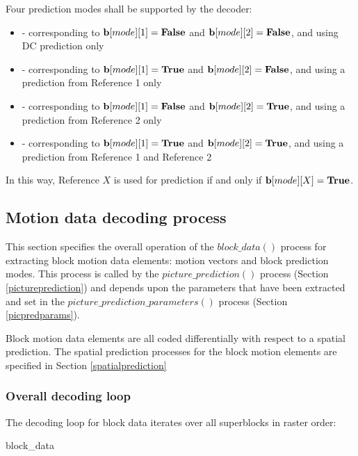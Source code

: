 Four prediction modes shall be supported by the decoder: 

\begin{itemize}
\item \Intra - corresponding to ${\bf b}[mode][1]=\text{\bf{False}}$ and ${\bf b}[mode][2]=\text{\bf{False}}$, and using DC prediction only
\item \RefOneOnly - corresponding to ${\bf b}[mode][1]=\text{\bf{True}}$ and ${\bf b}[mode][2]=\text{\bf{False}}$, and using a prediction from Reference 1 only
\item \RefTwoOnly - corresponding to ${\bf b}[mode][1]=\text{\bf{False}}$ and ${\bf b}[mode][2]=\text{\bf{True}}$, and using a prediction from Reference 2 only
\item \RefOneAndTwo - corresponding to ${\bf b}[mode][1]=\text{\bf{True}}$ and ${\bf b}[mode][2]=\text{\bf{True}}$, and using a prediction from Reference 1 and Reference 2
\end{itemize}

In this way, Reference $X$ is used for prediction if and only if ${\bf b}[mode][X]=\text{\bf{True}}$. 

\subsection{Motion data decoding process}

This section specifies the overall operation of the $block\_data()$ process for extracting
block motion data elements: motion vectors and block prediction modes. This 
process is called by the $picture\_prediction()$ process (Section \ref{pictureprediction}) and
depends upon the parameters that have been extracted and set in the
$picture\_prediction\_parameters()$ process (Section \ref{picpredparams}).

Block motion data elements are all coded differentially with respect to a spatial prediction. The
spatial prediction processes for the block motion elements are specified in Section \ref{spatialprediction}

\subsubsection{Overall decoding loop}

\label{decodingloop}

The decoding loop for block data iterates over all superblocks in raster order:

\begin{pseudo}{block\_data}{}
    \bsEND
\bsEND
{}
\end{pseudo}

